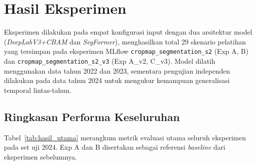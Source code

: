 
\section{Hasil Eksperimen}

Eksperimen dilakukan pada empat konfigurasi input dengan dua arsitektur model
(\textit{DeepLabV3+CBAM} dan \textit{SegFormer}), menghasilkan total 29 skenario pelatihan
yang tersimpan pada eksperimen MLflow \texttt{cropmap\_segmentation\_s2} (Exp A, B)
dan \texttt{cropmap\_segmentation\_s2\_v3} (Exp A\_v2, C\_v3).
Model dilatih menggunakan data tahun 2022 dan 2023, sementara pengujian independen dilakukan
pada data tahun 2024 untuk mengukur kemampuan generalisasi temporal lintas-tahun.

\subsection{Ringkasan Performa Keseluruhan}

Tabel~\ref{tab:hasil_utama} merangkum metrik evaluasi utama seluruh eksperimen pada set uji 2024.
Exp A dan B disertakan sebagai referensi \textit{baseline} dari eksperimen sebelumnya.

